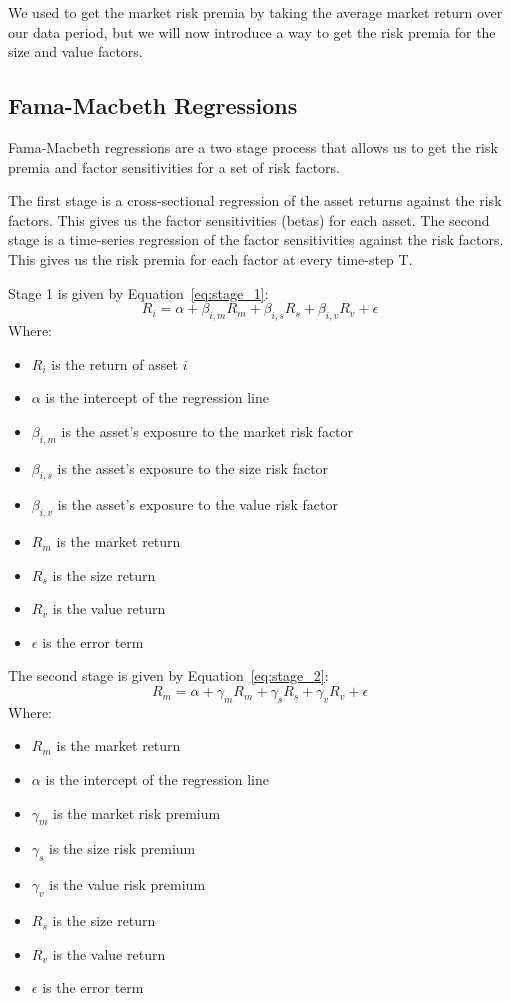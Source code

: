 We used to get the market risk premia by taking the average market return over our data period, but we will now introduce a way to get
the risk premia for the size and value factors.

\subsection{Fama-Macbeth Regressions}
Fama-Macbeth regressions are a two stage process that allows us to get the risk premia and factor sensitivities for a set of risk factors.

The first stage is a cross-sectional regression of the asset returns against the risk factors.
This gives us the factor sensitivities (betas) for each asset.
The second stage is a time-series regression of the factor sensitivities against the risk factors.
This gives us the risk premia for each factor at every time-step T.

Stage 1 is given by Equation~{\ref{eq:stage_1}}:
\begin{equation}
    \label{eq:stage_1}
    R_i = \alpha + \beta_{i,m} R_m + \beta_{i,s} R_s + \beta_{i,v} R_v + \epsilon
\end{equation}
Where:
\begin{itemize}
    \item $R_i$ is the return of asset $i$
    \item $\alpha$ is the intercept of the regression line
    \item $\beta_{i,m}$ is the asset's exposure to the market risk factor
    \item $\beta_{i,s}$ is the asset's exposure to the size risk factor
    \item $\beta_{i,v}$ is the asset's exposure to the value risk factor
    \item $R_m$ is the market return
    \item $R_s$ is the size return
    \item $R_v$ is the value return
    \item $\epsilon$ is the error term
\end{itemize}
The second stage is given by Equation~{\ref{eq:stage_2}}:
\begin{equation}
    \label{eq:stage_2}
    R_m = \alpha + \gamma_m R_m + \gamma_s R_s + \gamma_v R_v + \epsilon
\end{equation}
Where:
\begin{itemize}
    \item $R_m$ is the market return
    \item $\alpha$ is the intercept of the regression line
    \item $\gamma_m$ is the market risk premium
    \item $\gamma_s$ is the size risk premium
    \item $\gamma_v$ is the value risk premium
    \item $R_s$ is the size return
    \item $R_v$ is the value return
    \item $\epsilon$ is the error term
\end{itemize}

